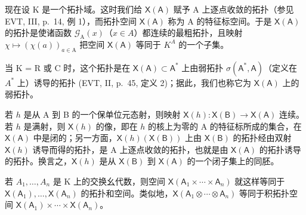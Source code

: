 现在设 K 是一个拓扑域。这时我们给 \(\mathsf{X}(\mathsf{A})\) 赋予 A 上逐点收敛的拓扑（参见 EVT, III, p.~14, 例 1），而拓扑空间 \(\mathsf{X}(\mathsf{A})\) 称为 A 的特征标空间。于是 \(\mathsf{X}(\mathsf{A})\) 的拓扑是使诸函数 \(\mathcal{G}_{\mathrm{A}}(x)\)（\(x \in A\)）都连续的最粗拓扑，且映射 \(\chi \mapsto (\chi(a))_{a \in \mathrm{A}}\) 把空间 \(\mathsf{X}(\mathsf{A})\) 等同于 \(K^{A}\) 的一个子集。

当 K = R 或 C 时，这个拓扑是在 \(\mathsf{X}(\mathsf{A}) \subset \mathsf{A}^{*}\) 上由弱拓扑 \(\sigma(\mathsf{A}^{*}, \mathsf{A})\)（定义在 \(A^{*}\) 上）诱导的拓扑 (EVT, II, p.~45, 定义 2)；据此，我们也称它为 \(\mathsf{X}(\mathsf{A})\) 上的弱拓扑。

若 \(h\) 是从 A 到 B 的一个保单位元态射，则映射 \(\mathsf{X}(h)\colon \mathsf{X}(\mathsf{B})\to \mathsf{X}(\mathsf{A})\) 连续。若 \(h\) 是满射，则 \(\mathsf{X}(h)\) 的像，即在 \(h\) 的核上为零的 A 的特征标所成的集合，在 \(\mathsf{X}(\mathsf{A})\) 中是闭的；另一方面，\(\mathsf{X}(h)(\mathsf{X}(\mathsf{B}))\) 上由 \(\mathsf{X}(\mathsf{B})\) 的拓扑经由双射 \(\mathsf{X}(h)\) 诱导而得的拓扑，是 A 上逐点收敛的拓扑，也就是由 \(\mathsf{X}(\mathsf{A})\) 的拓扑诱导的拓扑。换言之，\(\mathsf{X}(h)\) 是从 \(\mathsf{X}(\mathsf{B})\) 到 \(\mathsf{X}(\mathsf{A})\) 的一个闭子集上的同胚。

若 \(A_{1},\ldots,A_{n}\) 是 K 上的交换幺代数，则空间 \(\mathsf{X}(\mathsf{A}_{1}\times\cdots\times\mathsf{A}_{n})\) 就这样等同于 \(\mathsf{X}(\mathsf{A}_{1}),\ldots,\mathsf{X}(\mathsf{A}_{n})\) 的拓扑和空间。类似地，\(\mathsf{X}(\mathsf{A}_{1}\otimes\cdots\otimes\mathsf{A}_{n})\) 等同于积拓扑空间 \(\mathsf{X}(\mathsf{A}_{1})\times\cdots\times\mathsf{X}(\mathsf{A}_{n})\)。

